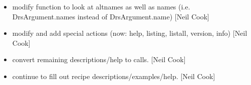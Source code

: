 \documentclass[a4paper,10pt,english]{report}
\begin{document}
\begin{itemize}
\item {} 
 \sphinxhyphen{} modify  function to look at
altnames as well as names (i.e. DrsArgument.names instead of
DrsArgument.name) {[}Neil Cook{]}

\item {} 
 \sphinxhyphen{} modify and add special actions (now: \textendash{}help,
\textendash{}listing, \textendash{}listall, \textendash{}version, \textendash{}info) {[}Neil Cook{]}

\item {} 
 \sphinxhyphen{} convert remaining descriptions/help to
 calls. {[}Neil Cook{]}

\item {} 
 \sphinxhyphen{} continue to fill out recipe
descriptions/examples/help. {[}Neil Cook{]}

\end{itemize}
\end{document}
